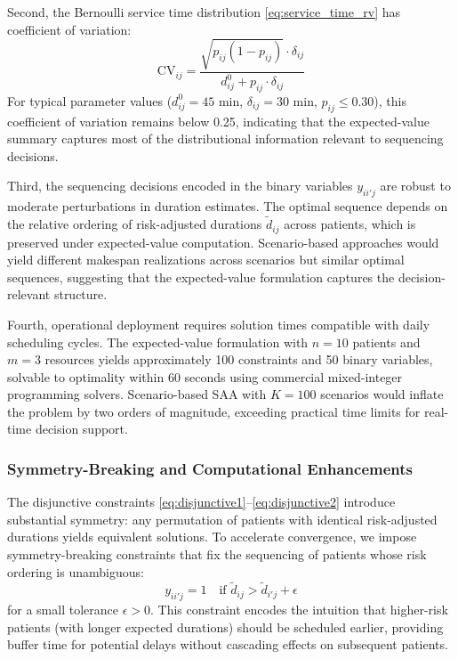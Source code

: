 \documentclass[11pt,a4paper]{article}
\begin{document}
Second, the Bernoulli service time distribution \eqref{eq:service_time_rv} has coefficient of variation:
\begin{equation}
\text{CV}_{ij} = \frac{\sqrt{p_{ij}(1-p_{ij})} \cdot \delta_{ij}}{d_{ij}^0 + p_{ij} \cdot \delta_{ij}}
\end{equation}
For typical parameter values ($d_{ij}^0 = 45$ min, $\delta_{ij} = 30$ min, $p_{ij} \leq 0.30$), this coefficient of variation remains below 0.25, indicating that the expected-value summary captures most of the distributional information relevant to sequencing decisions.

Third, the sequencing decisions encoded in the binary variables $y_{ii'j}$ are robust to moderate perturbations in duration estimates. The optimal sequence depends on the relative ordering of risk-adjusted durations $\tilde{d}_{ij}$ across patients, which is preserved under expected-value computation. Scenario-based approaches would yield different makespan realizations across scenarios but similar optimal sequences, suggesting that the expected-value formulation captures the decision-relevant structure.

Fourth, operational deployment requires solution times compatible with daily scheduling cycles. The expected-value formulation with $n = 10$ patients and $m = 3$ resources yields approximately 100 constraints and 50 binary variables, solvable to optimality within 60 seconds using commercial mixed-integer programming solvers. Scenario-based SAA with $K = 100$ scenarios would inflate the problem by two orders of magnitude, exceeding practical time limits for real-time decision support.

\subsubsection{Symmetry-Breaking and Computational Enhancements}

The disjunctive constraints \eqref{eq:disjunctive1}--\eqref{eq:disjunctive2} introduce substantial symmetry: any permutation of patients with identical risk-adjusted durations yields equivalent solutions. To accelerate convergence, we impose symmetry-breaking constraints that fix the sequencing of patients whose risk ordering is unambiguous:
\begin{equation}
y_{ii'j} = 1 \quad \text{if } \tilde{d}_{ij} > \tilde{d}_{i'j} + \epsilon
\label{eq:symmetry_breaking}
\end{equation}
for a small tolerance $\epsilon > 0$. This constraint encodes the intuition that higher-risk patients (with longer expected durations) should be scheduled earlier, providing buffer time for potential delays without cascading effects on subsequent patients.
\end{document}
